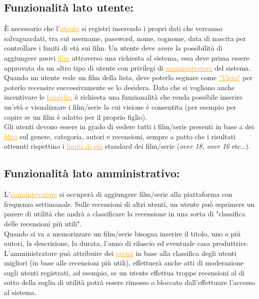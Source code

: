 \documentclass[a4paper,12pt]{report}
\begin{document}
\subsection{Funzionalità lato utente:}
È necessario che l'\textcolor{orange}{\underline{utente}} si registri inserendo i propri dati che verranno salvaguardati, tra cui username, password, nome, cognome, data di nascita per controllare i limiti di età sui film. Un utente deve avere la possibilità di aggiungere nuovi \textcolor{orange}{\underline{film}} attraverso una richiesta al sistema, essa deve prima essere approvata da un altro tipo di utente con privilegi di \textcolor{orange}{\underline{amministratore}} del sistema.\\
Quando un utente vede un film della lista, deve poterlo segnare come \textcolor{orange}{\underline{"Visto"}} per poterlo recensire successivamente se lo desidera. Dato che si vogliono anche incentivare le \textcolor{orange}{\underline{famiglie}}, è richiesta una funzionalità che renda possibile inserire un'età e visualizzare i film/serie la cui visione è consentita (per esempio per capire se un film è adatto per il proprio figlio).\\
Gli utenti devono essere in grado di vedere tutti i film/serie presenti in base a dei \textcolor{orange}{\underline{filtri}} sul genere, categoria, autori e recensioni, sempre a patto che i risultati ottenuti rispettino i \textcolor{orange}{\underline{limiti di età}} standard dei film/serie (\textit{over 18, over 16} etc\dots).
\subsection{Funzionalità lato amministrativo:}
L'\textcolor{orange}{\underline{amministratore}} si occuperà di aggiungere film/serie alla piattaforma con frequenza settimanale. Sulle recensioni di altri utenti, un utente può esprimere un parere di utilità che andrà a classificare la recensione in una sorta di "classifica delle recensioni più utili".\\
Quando si va a memorizzare un film/serie bisogna inserire il titolo, uno o più autori, la descrizione, la durata, l'anno di rilascio ed eventuale casa produttrice.
L'amministratore può attribuire dei \textcolor{orange}{\underline{premi}} in base alla classifica degli utenti migliori (in base alle recensioni più utili), effettuerà anche atti di moderazione sugli utenti registrati, ad esempio, se un utente effettua troppe recensioni al di sotto della soglia di utilità potrà essere rimosso o bloccato dall'effettuare l'accesso al sistema.
\end{document}
